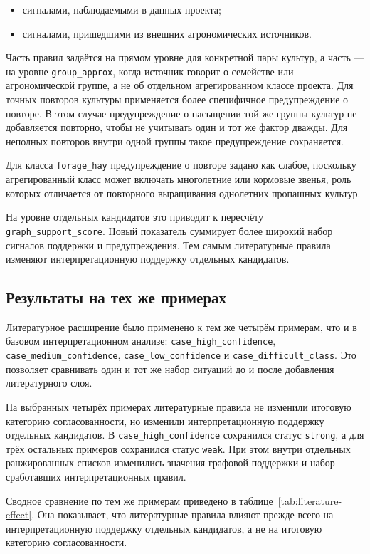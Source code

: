 \begin{itemize}
\tightlist
\item
  сигналами, наблюдаемыми в данных проекта;
\item
  сигналами, пришедшими из внешних агрономических источников.
\end{itemize}

Часть правил задаётся на прямом уровне для конкретной пары культур, а часть --- на уровне
\texttt{group\_approx}, когда источник говорит о семействе или агрономической группе, а не об отдельном агрегированном
классе проекта. Для точных повторов культуры применяется более специфичное предупреждение о повторе. В этом случае
предупреждение о насыщении той же группы культур не добавляется повторно, чтобы не учитывать один и тот же фактор
дважды. Для неполных повторов внутри одной группы такое предупреждение сохраняется.

Для класса \texttt{forage\_hay} предупреждение о повторе задано как слабое, поскольку агрегированный класс может
включать многолетние или кормовые звенья, роль которых отличается от повторного выращивания однолетних пропашных
культур.

На уровне отдельных кандидатов это приводит к пересчёту \texttt{graph\_support\_score}. Новый показатель суммирует
более широкий набор сигналов поддержки и предупреждения. Тем самым литературные правила изменяют интерпретационную
поддержку отдельных кандидатов.

\subsection{Результаты на тех же примерах}

Литературное расширение было применено к тем же четырём примерам, что и в базовом интерпретационном анализе:
\texttt{case\_high\_confidence}, \texttt{case\_medium\_confidence}, \texttt{case\_low\_confidence} и
\texttt{case\_difficult\_class}. Это позволяет сравнивать один и тот же набор ситуаций до и после добавления
литературного слоя.

На выбранных четырёх примерах литературные правила не изменили итоговую категорию согласованности, но изменили
интерпретационную поддержку отдельных кандидатов. В \texttt{case\_high\_confidence} сохранился статус
\texttt{strong}, а для трёх остальных примеров сохранился статус \texttt{weak}. При этом внутри отдельных
ранжированных списков изменились значения графовой поддержки и набор сработавших интерпретационных правил.

Сводное сравнение по тем же примерам приведено в таблице~\ref{tab:literature-effect}. Она показывает, что
литературные правила влияют прежде всего на интерпретационную поддержку отдельных кандидатов, а не на итоговую
категорию согласованности.

